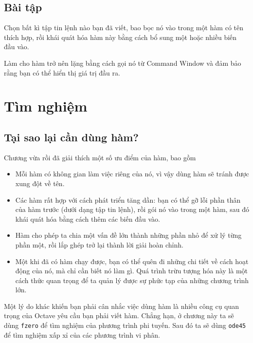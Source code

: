 \documentclass[12pt]{book}
\begin{document}
\section{Bài tập}

\begin{ex}
Chọn bất kì tập tin lệnh nào bạn đã viết, bao bọc nó vào trong
một hàm có tên thích hợp, rồi khái quát hóa hàm này bằng cách
bổ sung một hoặc nhiều biến đầu vào.

Làm cho hàm trở nên lặng bằng cách gọi nó từ Command
Window và đảm bảo rằng bạn có thể hiển thị giá trị đầu ra.
\end{ex}



\chapter{Tìm nghiệm}


\section{Tại sao lại cần dùng hàm?}

Chương vừa rồi đã giải thích một số ưu điểm của hàm, bao gồm

\begin{itemize}

\item Mỗi hàm có không gian làm việc riêng của nó, vì vậy dùng hàm 
sẽ tránh được xung đột về tên.

\item Các hàm rất hợp với cách phát triển tăng dần: bạn có thể gỡ lỗi
phần thân của hàm trước (dưới dạng tập tin lệnh), rồi gói nó vào
trong một hàm, sau đó khái quát hóa bằng cách thêm các biến đầu vào.

\item Hàm cho phép ta chia một vấn đề lớn thành những phần nhỏ
để xử lý từng phần một, rồi lắp ghép trở lại thành lời giải hoàn chỉnh.

\item Một khi đã có hàm chạy được, bạn có thể quên đi những chi tiết
về cách hoạt động của nó, mà chỉ cần biết nó làm gì. Quá trình trừu tượng hóa
này là một cách thức quan trọng để ta quản lý được sự phức tạp của
những chương trình lớn.

\end{itemize}

Một lý do khác khiến bạn phải cân nhắc việc dùng hàm là nhiều công cụ
quan trọng của Octave yêu cầu bạn phải viết hàm. Chẳng hạn, ở 
chương này ta sẽ dùng {\tt fzero} để tìm nghiệm của phương trình
phi tuyến. Sau đó ta sẽ dùng {\tt ode45} để tìm nghiệm xấp xỉ của
các phương trình vi phân.
\end{document}
